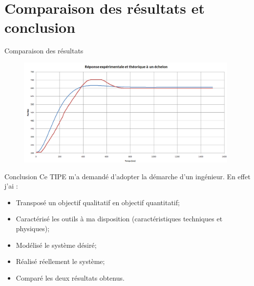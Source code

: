 \documentclass[french, handout]{beamer}
\begin{document}
    \section{Comparaison des résultats et conclusion}
    \begin{frame}{Comparaison des résultats}
        \begin{figure}
            \centering
            \includegraphics[width=11cm]{exp_theo_kp2.png}
        \end{figure}
    \end{frame}
    \begin{frame}{Conclusion}
    Ce TIPE m'a demandé d'adopter la démarche d'un ingénieur. En effet j'ai :
    \begin{itemize}
        \item Transposé un objectif qualitatif en objectif quantitatif;
        \item Caractérisé les outils à ma disposition (caractéristiques techniques et physiques);
        \item Modélisé le système désiré;
        \item Réalisé réellement le système;
        \item Comparé les deux résultats obtenus.
    \end{itemize}
        
    \end{frame}
    
\end{document}
